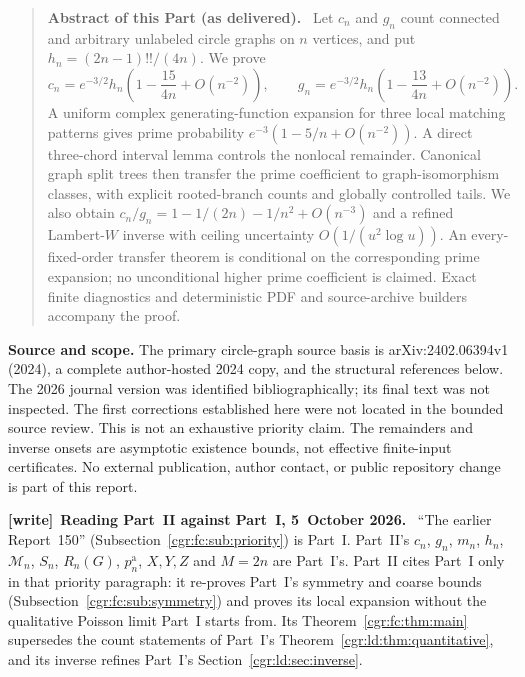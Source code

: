 \documentclass[11pt,letterpaper]{article}
\numberwithin{equation}{section}
\theoremstyle{definition}\newtheorem{definition}[theorem]{Definition}
\theoremstyle{remark}\newtheorem{remark}[theorem]{Remark}
\newenvironment{writenote}[1][]{\par\smallskip\begingroup\small
 \noindent\textbf{[write]}\if\relax\detokenize{#1}\relax\else~\textbf{#1.}\fi\ }%
 {\par\endgroup\smallskip}
\newenvironment{partabstract}{\begin{quote}\small\noindent\textbf{Abstract of this Part (as delivered).}\ }{\end{quote}}
\begin{document}
\begin{partabstract}
Let $c_n$ and $g_n$ count connected and arbitrary unlabeled circle
graphs on $n$ vertices, and put $h_n=(2n-1)!!/(4n)$. We prove
\[
 c_n=e^{-3/2}h_n\left(1-\frac{15}{4n}+O(n^{-2})\right),\qquad
 g_n=e^{-3/2}h_n\left(1-\frac{13}{4n}+O(n^{-2})\right).
\]
A uniform complex generating-function expansion for three local
matching patterns gives prime probability
$e^{-3}(1-5/n+O(n^{-2}))$. A direct three-chord interval lemma
controls the nonlocal remainder. Canonical graph split trees then
transfer the prime coefficient to graph-isomorphism classes, with
explicit rooted-branch counts and globally controlled tails.
We also obtain $c_n/g_n=1-1/(2n)-1/n^2+O(n^{-3})$ and a refined
Lambert-$W$ inverse with ceiling uncertainty $O(1/(u^2\log u))$.
An every-fixed-order transfer theorem is conditional on the
corresponding prime expansion; no unconditional higher prime
coefficient is claimed. Exact finite diagnostics and deterministic
PDF and source-archive builders accompany the proof.
\end{partabstract}
\noindent\textbf{Source and scope.} The primary circle-graph source
basis is arXiv:2402.06394v1 (2024), a complete author-hosted 2024
copy, and the structural references below. The 2026 journal version
was identified bibliographically; its final text was not inspected.
The first corrections established here were not located in the
bounded source review. This is not an exhaustive priority claim.
The remainders and inverse onsets are asymptotic existence bounds,
not effective finite-input certificates. No external publication,
author contact, or public repository change is part of this report.
\begin{writenote}[Reading Part~II against Part~I, 5~October 2026]
``The earlier Report~150'' (Subsection~\ref{cgr:fc:sub:priority}) is Part~I. Part~II's $c_n$, $g_n$, $m_n$, $h_n$, $\mathcal M_n$, $S_n$, $R_n(G)$, $p_n^{\mathrm a}$, $X,Y,Z$ and $M=2n$ are Part~I's. Part~II cites Part~I only in that priority paragraph: it re-proves Part~I's symmetry and coarse bounds (Subsection~\ref{cgr:fc:sub:symmetry}) and proves its local expansion without the qualitative Poisson limit Part~I starts from. Its Theorem~\ref{cgr:fc:thm:main} supersedes the count statements of Part~I's Theorem~\ref{cgr:ld:thm:quantitative}, and its inverse refines Part~I's Section~\ref{cgr:ld:sec:inverse}.
\end{writenote}
\end{document}
